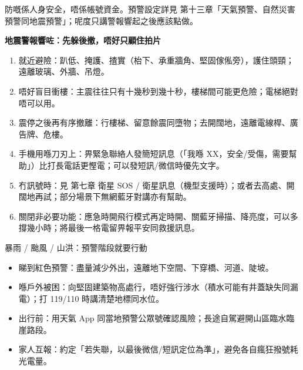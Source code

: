


防嘅係人身安全，唔係帳號資金。預警設定詳見 第十三章「天氣預警、自然災害預警同地震預警」；呢度只講警報響起之後應該點做。

\textbf{地震警報響咗：先躲後撤，唔好只顧住拍片}\par

\begin{enumerate}
  \item 就近避險：趴低、掩護、揸實（枱下、承重牆角、堅固傢俬旁），護住頭頸；遠離玻璃、外牆、吊燈。
  \item 唔好盲目衝樓：主震往往只有十幾秒到幾十秒，樓梯間可能更危險；電梯絕對唔可以用。
  \item 震停之後再有序撤離：行樓梯、留意餘震同墮物；去開闊地，遠離電線桿、廣告牌、危樓。
  \item 手機用喺刀刃上：畀緊急聯絡人發簡短訊息（「我喺 XX，安全/受傷，需要幫助」）比打長電話更慳電；可以發短訊/微信時優先文字。
  \item 冇訊號時：見 第七章 衛星 SOS / 衛星訊息（機型支援時）；或者去高處、開闊地再試；部分場景下無網藍牙對講亦有幫助。
  \item 關閉非必要功能：應急時開飛行模式再定時開、關藍牙掃描、降亮度，可以多撐幾小時；將最後一格電留畀報平安同救援訊息。
\end{enumerate}

\begin{tcbwarn}{暴雨 / 颱風 / 山洪：預警階段就要行動}
\begin{itemize}
  \item 睇到紅色預警：盡量減少外出，遠離地下空間、下穿橋、河道、陡坡。
  \item 喺戶外被困：向堅固建築物高處行，唔好強行涉水（積水可能有井蓋缺失同漏電）；打 119/110 時講清楚地標同水位。
  \item 出行前：用天氣 App 同當地預警公眾號確認風險；長途自駕避開山區臨水臨崖路段。
  \item 家人互報：約定「若失聯，以最後微信/短訊定位為準」，避免各自瘋狂撥號耗光電量。
\end{itemize}

\end{tcbwarn}

